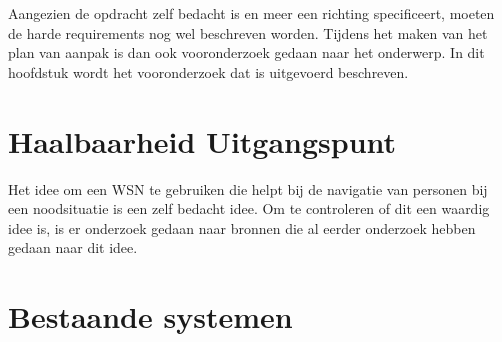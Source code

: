 
Aangezien de opdracht zelf bedacht is en meer een richting specificeert, moeten de harde requirements nog wel beschreven worden. Tijdens het maken van het plan van aanpak is dan ook vooronderzoek gedaan naar het onderwerp. In dit hoofdstuk wordt het vooronderzoek dat is uitgevoerd beschreven.

\section{Haalbaarheid Uitgangspunt}
Het idee om een WSN te gebruiken die helpt bij de navigatie van personen bij een noodsituatie is een zelf bedacht idee. Om te controleren of dit een waardig idee is, is er onderzoek gedaan naar bronnen die al eerder onderzoek hebben gedaan naar dit idee.



\section{Bestaande systemen}

